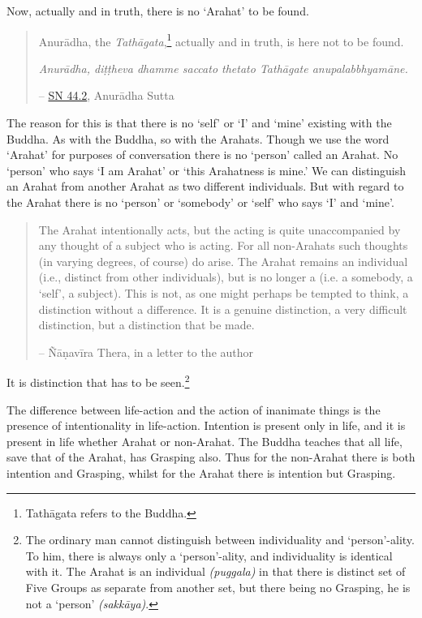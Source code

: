 Now, actually and in truth, there is no `Arahat' to be found.

\enlargethispage*{\baselineskip}

\begin{quote}
Anurādha, the \emph{Tathāgata},\footnote{Tathāgata refers to the Buddha.} actually and in truth, is here not to be found.

\emph{Anurādha, diṭṭheva dhamme saccato thetato Tathāgate anupalabbhyamāne.}

 -- \href{https://suttacentral.net/sn44.2/en/sujato}{SN 44.2}, Anurādha Sutta
\end{quote}

The reason for this is that there is no `self' or `I' and `mine' existing with the Buddha. As with the Buddha, so with the Arahats. Though we use the word `Arahat' for purposes of conversation there is no `person' called an Arahat. No `person' who says `I am Arahat' or `this Arahatness is mine.' We can distinguish an Arahat from another Arahat as two different individuals. But with regard to the Arahat there is no `person' or `somebody' or `self' who says `I' and `mine'.

\begin{quote}
The Arahat intentionally acts, but the acting is quite unaccompanied by any thought of a subject who is acting. For all non-Arahats such thoughts (in varying degrees, of course) do arise. The Arahat remains an individual (i.e., distinct from other individuals), but is no longer a  (i.e. a somebody, a `self', a subject). This is not, as one might perhaps be tempted to think, a distinction without a difference. It is a genuine distinction, a very difficult distinction, but a distinction that  be made.

 -- Ñāṇavīra Thera, in a letter to the author
\end{quote}

It is  distinction that has to be seen.\footnote{The ordinary man cannot distinguish between individuality and `person'-ality. To him, there is always only a `person'-ality, and individuality is identical with it. The Arahat is an individual \emph{(puggala)} in that there is distinct set of Five Groups as separate from another set, but there being no Grasping, he is not a `person' \emph{(sakkāya)}.}

The difference between life-action and the action of inanimate things is the presence of intentionality in life-action. Intention is present only in life, and it is present in  life whether Arahat or non-Arahat. The Buddha teaches that all life, save that of the Arahat, has Grasping also. Thus for the non-Arahat there is both intention and Grasping, whilst for the Arahat there is intention but  Grasping.


